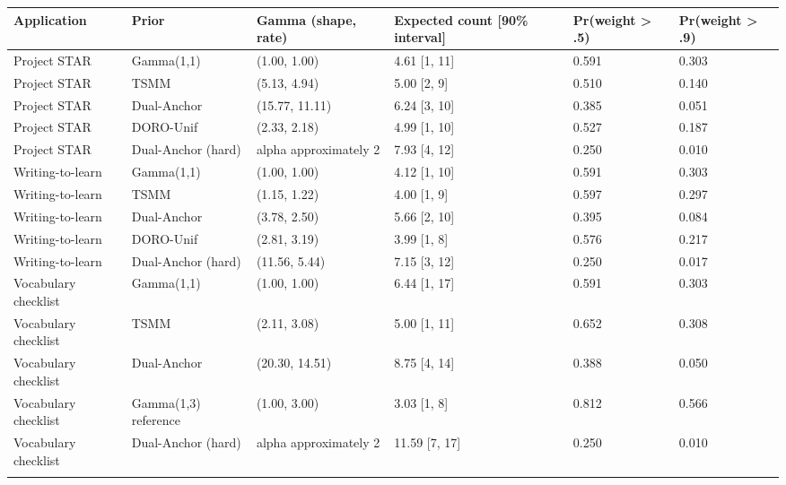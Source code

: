 \begin{longtable}{llllll}
\toprule
Application & Prior & Gamma (shape, rate) & Expected count [90\% interval] & Pr(weight > .5) & Pr(weight > .9) \\
\midrule\endhead
Project STAR & Gamma(1,1) & (1.00, 1.00) & 4.61 [1, 11] & 0.591 & 0.303 \\ \addlinespace[3pt]
Project STAR & TSMM & (5.13, 4.94) & 5.00 [2, 9] & 0.510 & 0.140 \\ \addlinespace[3pt]
Project STAR & Dual-Anchor & (15.77, 11.11) & 6.24 [3, 10] & 0.385 & 0.051 \\ \addlinespace[3pt]
Project STAR & DORO-Unif & (2.33, 2.18) & 4.99 [1, 10] & 0.527 & 0.187 \\ \addlinespace[3pt]
Project STAR & Dual-Anchor (hard) & alpha approximately 2 & 7.93 [4, 12] & 0.250 & 0.010 \\ \addlinespace[3pt]
Writing-to-learn & Gamma(1,1) & (1.00, 1.00) & 4.12 [1, 10] & 0.591 & 0.303 \\ \addlinespace[3pt]
Writing-to-learn & TSMM & (1.15, 1.22) & 4.00 [1, 9] & 0.597 & 0.297 \\ \addlinespace[3pt]
Writing-to-learn & Dual-Anchor & (3.78, 2.50) & 5.66 [2, 10] & 0.395 & 0.084 \\ \addlinespace[3pt]
Writing-to-learn & DORO-Unif & (2.81, 3.19) & 3.99 [1, 8] & 0.576 & 0.217 \\ \addlinespace[3pt]
Writing-to-learn & Dual-Anchor (hard) & (11.56, 5.44) & 7.15 [3, 12] & 0.250 & 0.017 \\ \addlinespace[3pt]
Vocabulary checklist & Gamma(1,1) & (1.00, 1.00) & 6.44 [1, 17] & 0.591 & 0.303 \\ \addlinespace[3pt]
Vocabulary checklist & TSMM & (2.11, 3.08) & 5.00 [1, 11] & 0.652 & 0.308 \\ \addlinespace[3pt]
Vocabulary checklist & Dual-Anchor & (20.30, 14.51) & 8.75 [4, 14] & 0.388 & 0.050 \\ \addlinespace[3pt]
Vocabulary checklist & Gamma(1,3) reference & (1.00, 3.00) & 3.03 [1, 8] & 0.812 & 0.566 \\ \addlinespace[3pt]
Vocabulary checklist & Dual-Anchor (hard) & alpha approximately 2 & 11.59 [7, 17] & 0.250 & 0.010 \\ \addlinespace[3pt]
\bottomrule\end{longtable}
